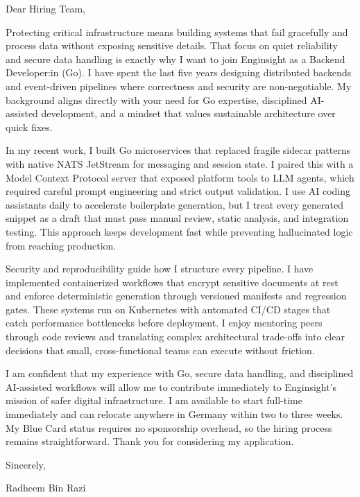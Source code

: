 \documentclass[11pt,a4paper]{coverletter}
\begin{document}

\opening{Dear Hiring Team,}

Protecting critical infrastructure means building systems that fail gracefully and process data without exposing sensitive details. That focus on quiet reliability and secure data handling is exactly why I want to join Enginsight as a Backend Developer:in (Go). I have spent the last five years designing distributed backends and event-driven pipelines where correctness and security are non-negotiable. My background aligns directly with your need for Go expertise, disciplined AI-assisted development, and a mindset that values sustainable architecture over quick fixes.

In my recent work, I built Go microservices that replaced fragile sidecar patterns with native NATS JetStream for messaging and session state. I paired this with a Model Context Protocol server that exposed platform tools to LLM agents, which required careful prompt engineering and strict output validation. I use AI coding assistants daily to accelerate boilerplate generation, but I treat every generated snippet as a draft that must pass manual review, static analysis, and integration testing. This approach keeps development fast while preventing hallucinated logic from reaching production.

Security and reproducibility guide how I structure every pipeline. I have implemented containerized workflows that encrypt sensitive documents at rest and enforce deterministic generation through versioned manifests and regression gates. These systems run on Kubernetes with automated CI/CD stages that catch performance bottlenecks before deployment. I enjoy mentoring peers through code reviews and translating complex architectural trade-offs into clear decisions that small, cross-functional teams can execute without friction.

I am confident that my experience with Go, secure data handling, and disciplined AI-assisted workflows will allow me to contribute immediately to Enginsight’s mission of safer digital infrastructure. I am available to start full-time immediately and can relocate anywhere in Germany within two to three weeks. My Blue Card status requires no sponsorship overhead, so the hiring process remains straightforward. Thank you for considering my application.

\closing{Sincerely,}{Radheem Bin Razi}

\clearpage
{}
\end{document}
